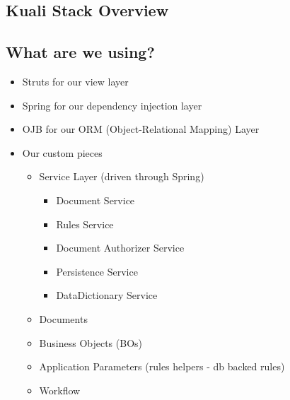 \begin{ifhtml}
    \begin{s5slide}
        \section{Kuali Stack Overview}
        \begin{ifhtml}
        \end{ifhtml} 
    \end{s5slide}
    \begin{s5slide}
        \section{What are we using?}
        \begin{ifhtml}
            \begin{itemize}
                \item Struts for our view layer
                \item Spring for our dependency injection layer
                \item OJB for our ORM (Object-Relational Mapping) Layer
            \end{itemize}
            \begin{itemize}
                \item Our custom pieces
                \begin{itemize}
                    \item Service Layer (driven through Spring)
                    \begin{itemize}
                        \item Document Service
                        \item Rules Service
                        \item Document Authorizer Service
                        \item Persistence Service
                        \item DataDictionary Service
                    \end{itemize}
                    \item Documents
                    \item Business Objects (BOs)
                    \item Application Parameters (rules helpers - db backed rules)
                    \item Workflow
                \end{itemize}
            \end{itemize}
        \end{ifhtml} 
    \end{s5slide}
    \begin{s5slide}

\end{s5slide}
\end{ifhtml}
